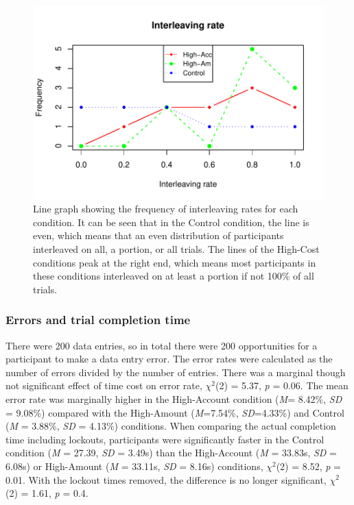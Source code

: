 \begin{figure}
 \includegraphics[width=\textwidth]{images/ch34/ch34-5_linechart.pdf}
\caption{Line graph showing the frequency of interleaving rates for each condition. It can be seen that in the Control condition, the line is even, which means that an even distribution of participants interleaved on all, a portion, or all trials. The lines of the High-Cost conditions peak at the right end, which means most participants in these conditions interleaved on at least a portion if not 100\% of all trials.}
\label{fig:ch34_5-linechart}
\end{figure}

\subsubsection{Errors and trial completion time}
There were 200 data entries, so in total there were 200 opportunities for a participant to make a data entry error. The error rates were calculated as the number of errors divided by the number of entries. 
There was a marginal though not significant effect of time cost on error rate, $\chi^2$(2) = 5.37, \textit{p} = 0.06. The mean error rate was marginally higher in the High-Account condition (\textit{M}= 8.42\%, \textit{SD} = 9.08\%) compared with the High-Amount (\textit{M}=7.54\%, \textit{SD}=4.33\%) and Control (\textit{M} = 3.88\%, \textit{SD} = 4.13\%) conditions. When comparing the actual completion time including lockouts, participants were significantly faster in the Control condition (\textit{M} = 27.39, \textit{SD} = 3.49s) than the High-Account (\textit{M} = 33.83s, \textit{SD} = 6.08s) or High-Amount (\textit{M} = 33.11s, \textit{SD} = 8.16s) conditions,  $\chi^2$(2) = 8.52, \textit{p} = 0.01. With the lockout times removed, the difference is no longer significant, $\chi^2$(2) = 1.61, \textit{p} = 0.4.

